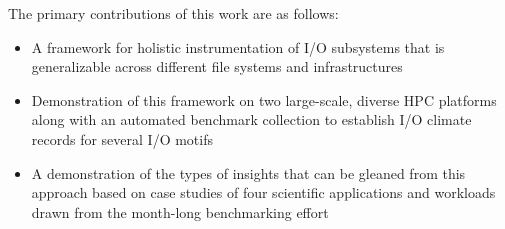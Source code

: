 The primary contributions of this work are as follows:

\begin{itemize}
\item A framework for holistic instrumentation of I/O subsystems that is generalizable across different file systems and infrastructures
\item Demonstration of this framework on two large-scale, diverse HPC platforms along with an automated benchmark collection to establish I/O climate records for several I/O motifs
\item A demonstration of the types of insights that can be gleaned from this approach based on case studies of four scientific applications and workloads drawn from the month-long benchmarking effort
\end{itemize}


